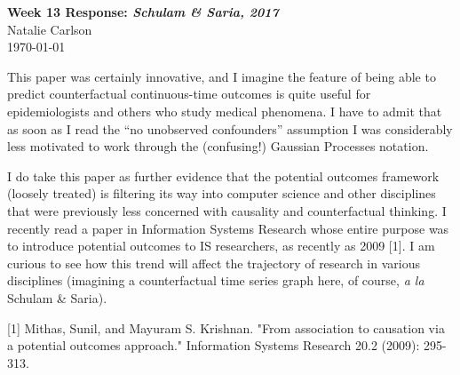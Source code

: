 \documentclass[12pt]{article}
\begin{document}
\begin{center}
  \Large \textbf{Week 13 Response: \textit{Schulam \& Saria, 2017}} \\
  \vspace{0.1in}
  \normalsize Natalie Carlson \\
  \today
\end{center}

This paper was certainly innovative, and I imagine the feature of being able to predict counterfactual continuous-time outcomes is quite useful for epidemiologists and others who study medical phenomena. I have to admit that as soon as I read the ``no unobserved confounders'' assumption I was considerably less motivated to work through the (confusing!) Gaussian Processes notation. 

I do take this paper as further evidence that the potential outcomes framework (loosely treated) is filtering its way into computer science and other disciplines that were previously less concerned with causality and counterfactual thinking. I recently read a paper in Information Systems Research whose entire purpose was to introduce potential outcomes to IS researchers, as recently as 2009 [1]. I am curious to see how this trend will affect the trajectory of research in various disciplines (imagining a counterfactual time series graph here, of course, \textit{a la} Schulam \& Saria).

[1] Mithas, Sunil, and Mayuram S. Krishnan. "From association to causation via a potential outcomes approach." Information Systems Research 20.2 (2009): 295-313.
\end{document}
